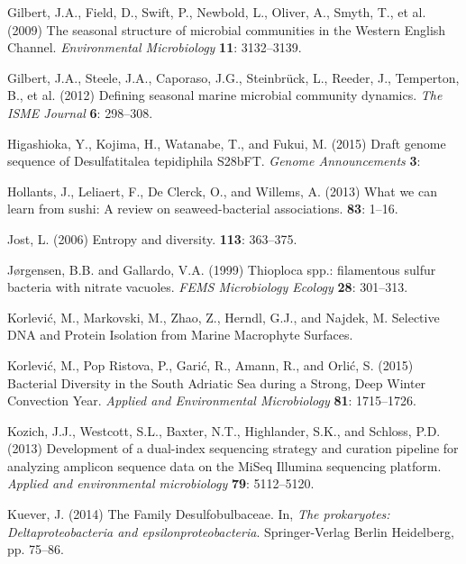 \documentclass[12pt,]{article}
\begin{document}
\leavevmode\hypertarget{ref-Gilbert2009}{}%
Gilbert, J.A., Field, D., Swift, P., Newbold, L., Oliver, A., Smyth, T.,
et al. (2009) The seasonal structure of microbial communities in the
Western English Channel. \emph{Environmental Microbiology} \textbf{11}:
3132--3139.

\leavevmode\hypertarget{ref-Gilbert2012}{}%
Gilbert, J.A., Steele, J.A., Caporaso, J.G., Steinbrück, L., Reeder, J.,
Temperton, B., et al. (2012) Defining seasonal marine microbial
community dynamics. \emph{The ISME Journal} \textbf{6}: 298--308.

\leavevmode\hypertarget{ref-Higashioka2015}{}%
Higashioka, Y., Kojima, H., Watanabe, T., and Fukui, M. (2015) Draft
genome sequence of Desulfatitalea tepidiphila S28bFT. \emph{Genome
Announcements} \textbf{3}:

\leavevmode\hypertarget{ref-Hollants2013}{}%
Hollants, J., Leliaert, F., De Clerck, O., and Willems, A. (2013) What
we can learn from sushi: A review on seaweed-bacterial associations.
\textbf{83}: 1--16.

\leavevmode\hypertarget{ref-Jost2006}{}%
Jost, L. (2006) Entropy and diversity. \textbf{113}: 363--375.

\leavevmode\hypertarget{ref-Jorgensen1999}{}%
Jørgensen, B.B. and Gallardo, V.A. (1999) Thioploca spp.: filamentous
sulfur bacteria with nitrate vacuoles. \emph{FEMS Microbiology Ecology}
\textbf{28}: 301--313.

\leavevmode\hypertarget{ref-Korlevic_submitted}{}%
Korlević, M., Markovski, M., Zhao, Z., Herndl, G.J., and Najdek, M.
Selective DNA and Protein Isolation from Marine Macrophyte Surfaces.

\leavevmode\hypertarget{ref-Korlevic2015}{}%
Korlević, M., Pop Ristova, P., Garić, R., Amann, R., and Orlić, S.
(2015) Bacterial Diversity in the South Adriatic Sea during a Strong,
Deep Winter Convection Year. \emph{Applied and Environmental
Microbiology} \textbf{81}: 1715--1726.

\leavevmode\hypertarget{ref-Kozich2013}{}%
Kozich, J.J., Westcott, S.L., Baxter, N.T., Highlander, S.K., and
Schloss, P.D. (2013) Development of a dual-index sequencing strategy and
curation pipeline for analyzing amplicon sequence data on the MiSeq
Illumina sequencing platform. \emph{Applied and environmental
microbiology} \textbf{79}: 5112--5120.

\leavevmode\hypertarget{ref-Kuever2014}{}%
Kuever, J. (2014) The Family Desulfobulbaceae. In, \emph{The
prokaryotes: Deltaproteobacteria and epsilonproteobacteria}.
Springer-Verlag Berlin Heidelberg, pp. 75--86.
\end{document}
